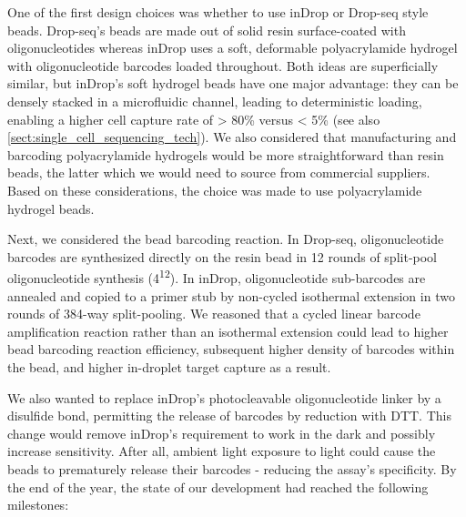 One of the first design choices was whether to use inDrop or Drop-seq style beads. Drop-seq's beads are made out of solid resin surface-coated with oligonucleotides whereas inDrop uses a soft, deformable polyacrylamide hydrogel with oligonucleotide barcodes loaded throughout. Both ideas are superficially similar, but inDrop's soft hydrogel beads have one major advantage: they can be densely stacked in a microfluidic channel, leading to deterministic loading, enabling a higher cell capture rate of > 80\% versus < 5\% (see also \autoref{sect:single_cell_sequencing_tech}). We also considered that manufacturing and barcoding polyacrylamide hydrogels would be more straightforward than resin beads, the latter which we would need to source from commercial suppliers. Based on these considerations, the choice was made to use polyacrylamide hydrogel beads.


Next, we considered the bead barcoding reaction. In Drop-seq, oligonucleotide barcodes are synthesized directly on the resin bead in 12 rounds of split-pool oligonucleotide synthesis (4\textsuperscript{12}). In inDrop, oligonucleotide sub-barcodes are annealed and copied to a primer stub by non-cycled isothermal extension in two rounds of 384-way split-pooling. We reasoned that a cycled linear barcode amplification reaction rather than an isothermal extension could lead to higher bead barcoding reaction efficiency, subsequent higher density of barcodes within the bead, and higher in-droplet target capture as a result.

We also wanted to replace inDrop's photocleavable oligonucleotide linker by a disulfide bond, permitting the release of barcodes by reduction with DTT. This change would remove inDrop's requirement to work in the dark and possibly increase sensitivity. After all, ambient light exposure to light could cause the beads to prematurely release their barcodes - reducing the assay's specificity. By the end of the year, the state of our development had reached the following milestones:

